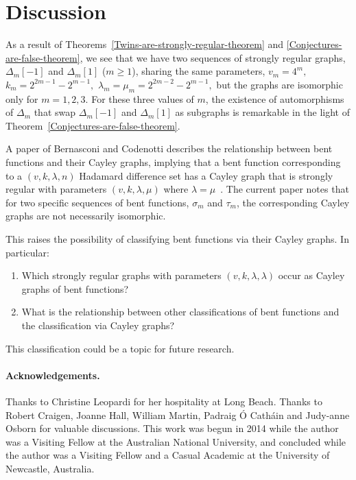 \documentclass[12pt,a4paper]{article}
\begin{document}
\section{Discussion}
\label{sec-Discussion}
As a result of Theorems~\ref{Twins-are-strongly-regular-theorem} and \ref{Conjectures-are-false-theorem},
we see that we have two sequences of strongly regular graphs, $\varDelta_m[-1]$ and $\varDelta_m[1]$ ($m \geqslant 1$),
sharing the same parameters, 
$v_m = 4^m,$ $k_m = 2^{2 m - 1} - 2^{m - 1},$ $\lambda_m=\mu_m=2^{2 m - 2} - 2^{m - 1},$
but the graphs are isomorphic only for $m=1, 2, 3$.
For these three values of $m$, the existence of
automorphisms of $\varDelta_m$ that swap $\varDelta_m[-1]$ and $\varDelta_m[1]$ 
as subgraphs \cite[Table 1]{Leo14Constructions}
is remarkable in the light of Theorem~\ref{Conjectures-are-false-theorem}.

A paper of Bernasconi and Codenotti describes the relationship between bent functions and
their Cayley graphs, implying that a bent function corresponding to a $(v,k,\lambda,n)$ Hada\-mard difference set has a Cayley graph 
that is strongly regular with parameters $(v,k,\lambda,\mu)$ where $\lambda=\mu$~\cite[Lemma 12]{BerC99}.
The current paper notes that for two specific sequences of bent functions, $\sigma_m$ and $\tau_m$,
the corresponding Cayley graphs are not necessarily isomorphic.

This raises the possibility of classifying bent functions via their Cayley graphs.
In particular:
\begin{enumerate}
\item Which strongly regular graphs with parameters $(v,k,\lambda,\lambda)$ occur as Cayley graphs of bent functions?
\item What is the relationship between other classifications of bent functions and the classification via Cayley graphs?
\end{enumerate}
This classification could be a topic for future research.

\paragraph*{Acknowledgements.}

Thanks to Christine Leopardi for her hospitality at Long Beach.
Thanks to Robert Craigen, Joanne Hall, William Martin,
Padraig {\'O} Cath{\'a}in and Judy-anne Osborn for valuable discussions.
This work was begun in 2014 while the author was a Visiting Fellow at the Australian National University, 
and concluded while the author was a Visiting Fellow and a Casual Academic at the University of Newcastle, Australia.








%
\end{document}
